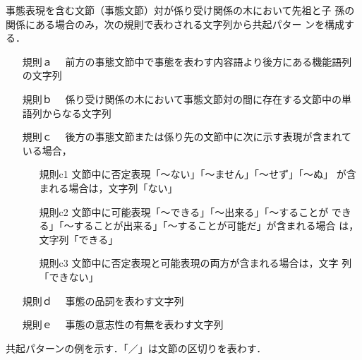 \documentclass[japanese]{jnlp_1.4}
\begin{document}
事態表現を含む文節（事態文節）対が係り受け関係の木において先祖と子
  孫の関係にある場合のみ，次の規則で表わされる文字列から共起パター
  ンを構成する．
\begin{itemize}
\item[規則ａ\hspace{-1zw}] 　前方の事態文節中で事態を表わす内容語より後方にある機能語列
  の文字列
\item[規則ｂ\hspace{-1zw}] 　係り受け関係の木において事態文節対の間に存在する文節中の単
  語列からなる文字列
\item[規則ｃ\hspace{-1zw}] 　後方の事態文節または係り先の文節中に次に示す表現が含まれて
  いる場合，
  \begin{itemize}
  \item[規則c1] 文節中に否定表現「〜ない」「〜ません」「〜せず」「〜ぬ」
    が含まれる場合は，文字列「ない」
  \item[規則c2] 文節中に可能表現「〜できる」「〜出来る」「〜することが
    できる」「〜することが出来る」「〜することが可能だ」が含まれる場合
    は，文字列「できる」
  \item[規則c3] 文節中に否定表現と可能表現の両方が含まれる場合は，文字
    列「できない」
  \end{itemize}
\item[規則ｄ\hspace{-1zw}] 　事態の品詞を表わす文字列
\item[規則ｅ\hspace{-1zw}] 　事態の意志性の有無を表わす文字列
\end{itemize}

共起パターンの例を示す．「／」は文節の区切りを表わす．
\end{document}
